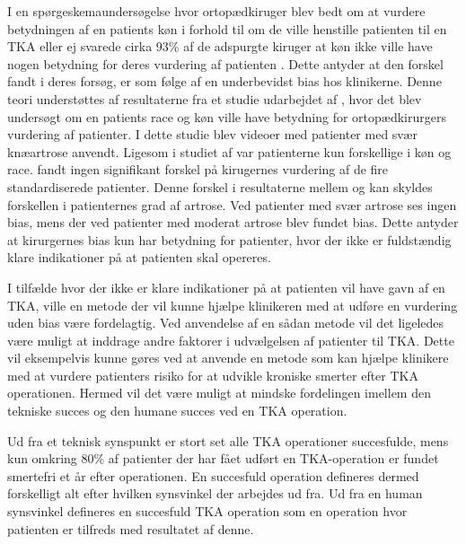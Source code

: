 I en spørgeskemaundersøgelse hvor ortopædkiruger blev bedt om at vurdere betydningen af en patients køn i forhold til om de ville henstille patienten til en TKA eller ej svarede cirka 93\% af de adspurgte kiruger at køn ikke ville have nogen betydning for deres vurdering af patienten \citep{wright1995}. Dette antyder at den forskel \cite{borkhoff2008} fandt i deres forsøg, er som følge af en underbevidst bias hos klinikerne. Denne teori understøttes af resultaterne fra et studie udarbejdet af \cite{dy2014}, hvor det blev undersøgt om en patients race og køn ville have betydning for ortopædkirurgers vurdering af patienter. I dette studie blev videoer med patienter med svær knæartrose anvendt. Ligesom i studiet af \cite{borkhoff2008} var patienterne kun forskellige i køn og race. \cite{dy2014} fandt ingen signifikant forskel på kirugernes vurdering af de fire standardiserede patienter. Denne forskel i resultaterne mellem \cite{borkhoff2008} og \cite{dy2014} kan skyldes forskellen i patienternes grad af artrose. Ved patienter med svær artrose ses ingen bias, mens der ved patienter med moderat artrose blev fundet bias. Dette antyder at kirurgernes bias kun har betydning for patienter, hvor der ikke er fuldstændig klare indikationer på at patienten skal opereres. 

I tilfælde hvor der ikke er klare indikationer på at patienten vil have gavn af en TKA, ville en metode der vil kunne hjælpe klinikeren med at udføre en vurdering uden bias være fordelagtig. Ved anvendelse af en sådan metode vil det ligeledes være muligt at inddrage andre faktorer i udvælgelsen af patienter til TKA. Dette vil eksempelvis kunne gøres ved at anvende en metode som kan hjælpe klinikere med at vurdere patienters risiko for at udvikle kroniske smerter efter TKA operationen. Hermed vil det være muligt at mindske fordelingen imellem den tekniske succes og den humane succes ved en TKA operation.

Ud fra et teknisk synspunkt er stort set alle TKA operationer succesfulde, mens kun omkring 80\% af patienter der har fået udført en TKA-operation er fundet smertefri et år efter operationen. \citep{aarsrapport2016}
\citep{Bourne2010} En succesfuld operation defineres dermed forskelligt alt efter hvilken synsvinkel der arbejdes ud fra. Ud fra en human synsvinkel defineres en succesfuld TKA operation som en operation hvor patienten er tilfreds med resultatet af denne. 


